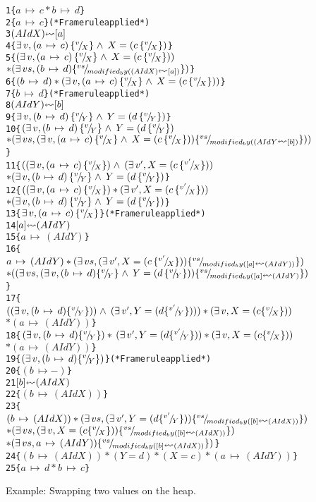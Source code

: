 \begin{figure}
\begin{alltt}
1  \{\( a\,\mapsto\,c * b\,\mapsto\,d \)\}
2     \{\( a\,\mapsto\,c \)\}                    (* Frame rule applied *)
3        \((AId X) \lsquigarr [ a ]\)
4     \{\( \exists\,v,(a\,\mapsto\,c)\,\subst{v}{X}\land\,X=(c\,\subst{v}{X}) \)\}
5  \{\( (\exists\,v,(a\,\mapsto\,c)\,\subst{v}{X}\land\,X=(c\,\subst{v}{X})) \)
      \(* (\exists\,vs,(b\,\mapsto\,d)\subst{vs}{modified_by((AId X)\lsquigarr[a])}) \)\}
6  \{\( (b\,\mapsto\,d)*(\exists\,v,(a\,\mapsto\,c)\,\subst{v}{X}\land\,X=(c\,\subst{v}{X})) \)\}
7     \{\( b\,\mapsto\,d \)\}                    (* Frame rule applied *)
8        \((AId Y) \lsquigarr [ b ]\)
9     \{\( \exists\,v,(b\,\mapsto\,d)\,\subst{v}{Y}\land\,Y=(d\,\subst{v}{Y}) \)\}
10 \{\( (\exists\,v,(b\,\mapsto\,d)\,\subst{v}{Y}\land\,Y=(d\,\subst{v}{Y}) \)
      \(* (\exists\,vs,(\exists\,v,(a\,\mapsto\,c)\,\subst{v}{X}\land\,X=(c\,\subst{v}{X}))\subst{vs}{modified_by((AId Y\lsquigarr[b])})) \)\}
11 \{\( ((\exists\,v,(a\,\mapsto\,c)\,\subst{v}{X})\land\,(\exists\,v',X=(c\,\subst{v'}{X}))\)
      \(* (\exists\,v,(b\,\mapsto\,d)\,\subst{v}{Y}\land\,Y=(d\,\subst{v}{Y}) \)\}
12 \{\( ((\exists\,v,(a\,\mapsto\,c)\,\subst{v}{X})*(\exists\,v',X=(c\,\subst{v'}{X}))\)
      \(* (\exists\,v,(b\,\mapsto\,d)\,\subst{v}{Y}\land\,Y=(d\,\subst{v}{Y}) \)\}
13    \{\( \exists\,v,(a\,\mapsto\,c)\,\subst{v}{X} \)\}           (* Frame rule applied *)
14       \([ a ] \lsquigarr (AId Y)\)
15    \{\( a\,\mapsto\,(AId Y) \)\}
16 \{\( a\,\mapsto\,(AId Y)*(\exists\,vs,(\exists\,v',X=(c\,\subst{v'}{X}))\subst{vs}{modified_by([a]\lsquigarr(AId Y))}) \)
      \(* ((\exists\,vs,(\exists\,v,(b\,\mapsto\,d)\subst{v}{Y}\land\,Y=(d\,\subst{v}{Y}))\subst{vs}{modified_by([a]\lsquigarr(AId Y)}) \)\}
17 \{\( ((\exists\,v,(b\,\mapsto\,d)\subst{v}{Y}))\land\,(\exists\,v',Y=(d\subst{v'}{Y})))*(\exists\,v,X=(c\subst{v}{X})) \)
      \(* (a\,\mapsto\,(AId Y)) \)\}
18 \{\( (\exists\,v,(b\,\mapsto\,d)\subst{v}{Y})*\,(\exists\,v',Y=(d\subst{v'}{Y}))*(\exists\,v,X=(c\subst{v}{X})) \)
      \(* (a\,\mapsto\,(AId Y)) \)\}
19    \{\( (\exists\,v,(b\,\mapsto\,d)\subst{v}{Y}) \)\}           (* Frame rule applied *)
20    \{\( (b\,\mapsto-) \)\}
21       \([ b ] \lsquigarr (AId X)\)
22    \{\( (b\,\mapsto\,(AId X)) \)\}
23 \{\( (b\,\mapsto\,(AId X))*(\exists\,vs,(\exists\,v',Y=(d\subst{v'}{Y}))\subst{vs}{modified_by([b]\lsquigarr(AId X))}) \)
      \(* (\exists\,vs,(\exists\,v,X=(c\subst{v}{X}))\subst{vs}{modified_by([b]\lsquigarr(AId X))}) \)
      \(* (\exists\,vs,a\,\mapsto\,(AId Y))\subst{vs}{modified_by([b]\lsquigarr(AId X))}) \)\}
24 \{\( (b\,\mapsto\,(AId X))*(Y=d)*(X=c)*(a\,\mapsto\,(AId Y)) \)\}
25 \{\({ a\,\mapsto\,d * b\,\mapsto\,c }\)\}
\end{alltt}
\caption{Example: Swapping two values on the heap.}
\label{fig:dec_example}
\end{figure}